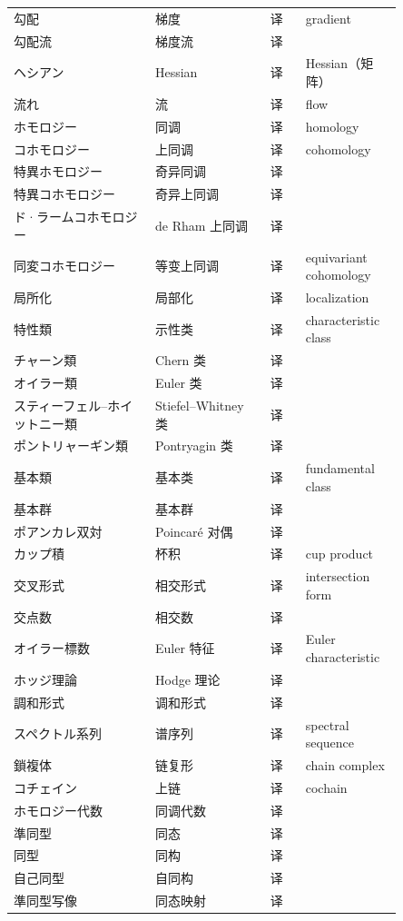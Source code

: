 {\begin{longtable}{p{0.32\linewidth} p{0.26\linewidth} p{0.08\linewidth} p{0.19\linewidth}}
勾配 & 梯度 & 译 & gradient \\
勾配流 & 梯度流 & 译 &  \\
ヘシアン & Hessian & 译 & Hessian（矩阵） \\
流れ & 流 & 译 & flow \\
ホモロジー & 同调 & 译 & homology \\
コホモロジー & 上同调 & 译 & cohomology \\
特異ホモロジー & 奇异同调 & 译 &  \\
特異コホモロジー & 奇异上同调 & 译 &  \\
ド·ラームコホモロジー & de Rham 上同调 & 译 &  \\
同変コホモロジー & 等变上同调 & 译 & equivariant cohomology \\
局所化 & 局部化 & 译 & localization \\
特性類 & 示性类 & 译 & characteristic class \\
チャーン類 & Chern 类 & 译 &  \\
オイラー類 & Euler 类 & 译 &  \\
スティーフェル–ホイットニー類 & Stiefel–Whitney 类 & 译 &  \\
ポントリャーギン類 & Pontryagin 类 & 译 &  \\
基本類 & 基本类 & 译 & fundamental class \\
基本群 & 基本群 & 译 &  \\
ポアンカレ双対 & Poincaré 对偶 & 译 &  \\
カップ積 & 杯积 & 译 & cup product \\
交叉形式 & 相交形式 & 译 & intersection form \\
交点数 & 相交数 & 译 &  \\
オイラー標数 & Euler 特征 & 译 & Euler characteristic \\
ホッジ理論 & Hodge 理论 & 译 &  \\
調和形式 & 调和形式 & 译 &  \\
スペクトル系列 & 谱序列 & 译 & spectral sequence \\
鎖複体 & 链复形 & 译 & chain complex \\
コチェイン & 上链 & 译 & cochain \\
ホモロジー代数 & 同调代数 & 译 &  \\
準同型 & 同态 & 译 &  \\
同型 & 同构 & 译 &  \\
自己同型 & 自同构 & 译 &  \\
準同型写像 & 同态映射 & 译 &  \\

\end{longtable}}
